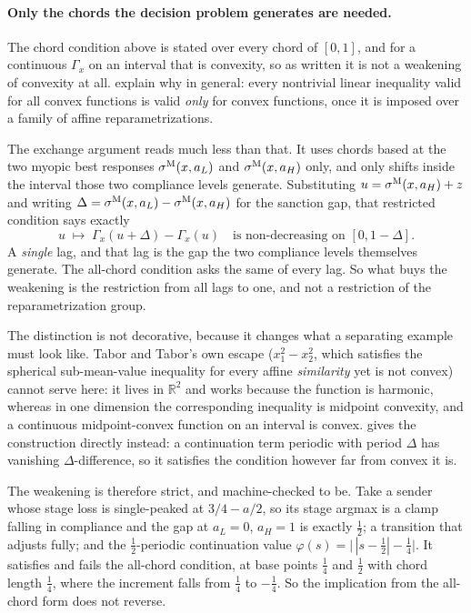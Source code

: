 \paragraph{Only the chords the decision problem generates are needed.}
The chord condition above is stated over every chord of $[0,1]$, and for a
continuous $\Gamma_x$ on an interval that is convexity, so as written it is not a
weakening of convexity at all. \citet{TaborTabor2009} explain why in general:
every nontrivial linear inequality valid for all convex functions is valid
\emph{only} for convex functions, once it is imposed over a family of affine
reparametrizations.

The exchange argument reads much less than that. It uses chords based at the two
myopic best responses $\sigma^{\mathrm{M}}(x,a_L)$ and $\sigma^{\mathrm{M}}(x,a_H)$ only, and only shifts inside
the interval those two compliance levels generate. Substituting
$u=\sigma^{\mathrm{M}}(x,a_H)+z$ and writing $\Delta=\sigma^{\mathrm{M}}(x,a_L)-\sigma^{\mathrm{M}}(x,a_H)$ for the
sanction gap, that restricted condition says exactly
\begin{equation}
u\;\longmapsto\; \Gamma_x(u+\Delta)-\Gamma_x(u)
\quad\text{is non-decreasing on } [0,1-\Delta].
\label{eq:generated-chord}
\end{equation}
A \emph{single} lag, and that lag is the gap the two compliance levels
themselves generate. The all-chord condition asks the same of every lag. So what
buys the weakening is the restriction from all lags to one, and not a restriction
of the reparametrization group.

The distinction is not decorative, because it changes what a separating example
must look like. Tabor and Tabor's own escape ($x_1^2-x_2^2$, which satisfies
the spherical sub-mean-value inequality for every affine \emph{similarity} yet is
not convex) cannot serve here: it lives in $\mathbb{R}^2$ and works because the
function is harmonic, whereas in one dimension the corresponding inequality is
midpoint convexity, and a continuous midpoint-convex function on an interval is
convex.  gives the construction directly instead: a
continuation term periodic with period $\Delta$ has vanishing $\Delta$-difference,
so it satisfies the condition however far from convex it is.

The weakening is therefore strict, and machine-checked to be. Take a sender whose
stage loss is single-peaked at $3/4-a/2$, so its stage argmax is a clamp falling
in compliance and the gap at $a_L=0$, $a_H=1$ is exactly $\tfrac12$; a transition
that adjusts fully; and the $\tfrac12$-periodic continuation value
$\varphi(s)=\bigl|\,|s-\tfrac12|-\tfrac14\bigr|$. It satisfies
 and fails the all-chord condition, at base points
$\tfrac14$ and $\tfrac12$ with chord length $\tfrac14$, where the increment falls
from $\tfrac14$ to $-\tfrac14$. So the implication from the all-chord form does
not reverse.

